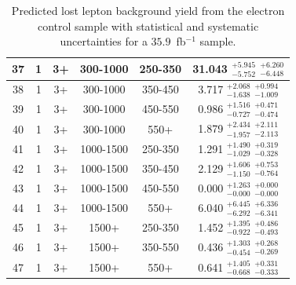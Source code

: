 \begin{table}[htbp]
\fontsize{10 pt}{1.2 em}
\selectfont
\begin{centering}
\caption{\label{tab:LLpredel2} Predicted lost lepton background yield from the electron control sample with statistical and systematic uncertainties for a $35.9$~fb$^{-1}$ sample.}
\hspace*{-4ex}
\begin{tabular}{|c|c|c|c|c||c|}
\hline
37 &               1 &              3+ &        300-1000 &         250-350 & 31.043 $^{+5.945}_{-5.752}$ $^{+6.260}_{-6.448}$ \\ 
\hline
38 &               1 &              3+ &        300-1000 &         350-450 & 3.717 $^{+2.068}_{-1.638}$ $^{+0.994}_{-1.009}$ \\ 
\hline
39 &               1 &              3+ &        300-1000 &         450-550 & 0.986 $^{+1.516}_{-0.727}$ $^{+0.471}_{-0.474}$ \\ 
\hline
40 &               1 &              3+ &        300-1000 &            550+ & 1.879 $^{+2.434}_{-1.957}$ $^{+2.111}_{-2.113}$ \\ 
\hline
41 &               1 &              3+ &       1000-1500 &         250-350 & 1.291 $^{+1.490}_{-1.029}$ $^{+0.319}_{-0.328}$ \\ 
\hline
42 &               1 &              3+ &       1000-1500 &         350-450 & 2.129 $^{+1.606}_{-1.150}$ $^{+0.753}_{-0.764}$ \\ 
\hline
43 &               1 &              3+ &       1000-1500 &         450-550 & 0.000 $^{+1.263}_{-0.000}$ $^{+0.000}_{-0.000}$ \\ 
\hline
44 &               1 &              3+ &       1000-1500 &            550+ & 6.040 $^{+6.445}_{-6.292}$ $^{+6.336}_{-6.341}$ \\ 
\hline
45 &               1 &              3+ &           1500+ &         250-350 & 1.452 $^{+1.395}_{-0.922}$ $^{+0.486}_{-0.493}$ \\ 
\hline
46 &               1 &              3+ &           1500+ &         350-550 & 0.436 $^{+1.303}_{-0.454}$ $^{+0.268}_{-0.269}$ \\ 
\hline
47 &               1 &              3+ &           1500+ &            550+ & 0.641 $^{+1.405}_{-0.668}$ $^{+0.331}_{-0.333}$ \\ 
\hline
\end{tabular}
\par\end{centering}
\end{table}

